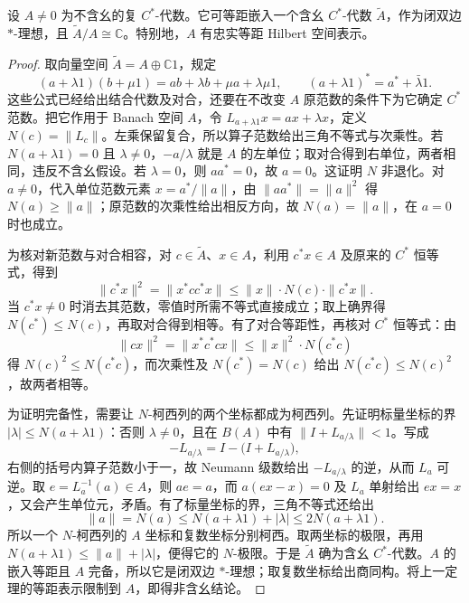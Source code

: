 \begin{proposition}[添幺与非含幺表示]\label{b2:prop:cstar-unitization-representation}
	设 \(A\ne0\) 为不含幺的复 \(C^*\)-代数。它可等距嵌入一个含幺 \(C^*\)-代数 \(\widetilde A\)，作为闭双边 \(*\)-理想，且 \(\widetilde A/A\cong\mathbb C\)。特别地，\(A\) 有忠实等距 Hilbert 空间表示。
\end{proposition}
\begin{proof}
	取向量空间 \(\widetilde A=A\oplus\mathbb C1\)，规定
	\[
		(a+\lambda1)(b+\mu1)=ab+\lambda b+\mu a+\lambda\mu1, \qquad (a+\lambda1)^*=a^*+\bar\lambda1.
	\]
	这些公式已经给出结合代数及对合，还要在不改变 \(A\) 原范数的条件下为它确定 \(C^*\) 范数。把它作用于 Banach 空间 \(A\)，令 \(L_{a+\lambda1}x=ax+\lambda x\)，定义 \(N(c)=\|L_c\|\)。左乘保留复合，所以算子范数给出三角不等式与次乘性。若 \(N(a+\lambda1)=0\) 且 \(\lambda\ne0\)，\(-a/\lambda\) 就是 \(A\) 的左单位；取对合得到右单位，两者相同，违反不含幺假设。若 \(\lambda=0\)，则 \(aa^*=0\)，故 \(a=0\)。这证明 \(N\) 非退化。对 \(a\ne0\)，代入单位范数元素 \(x=a^*/\|a\|\)，由 \(\|aa^*\|=\|a\|^2\) 得 \(N(a)\ge\|a\|\)；原范数的次乘性给出相反方向，故 \(N(a)=\|a\|\)，在 \(a=0\) 时也成立。

	为核对新范数与对合相容，对 \(c\in\widetilde A\)、\(x\in A\)，利用 \(c^*x\in A\) 及原来的 \(C^*\) 恒等式，得到
	\[
		\|c^*x\|^2=\|x^*cc^*x\| \le\|x\|\cdot N(c)\cdot\|c^*x\|.
	\]
	当 \(c^*x\ne0\) 时消去其范数，零值时所需不等式直接成立；取上确界得 \(N(c^*)\le N(c)\)，再取对合得到相等。有了对合等距性，再核对 \(C^*\) 恒等式：由
	\[
		\|cx\|^2=\|x^*c^*cx\|\le\|x\|^2\cdot N(c^*c)
	\]
	得 \(N(c)^2\le N(c^*c)\)，而次乘性及 \(N(c^*)=N(c)\) 给出 \(N(c^*c)\le N(c)^2\)，故两者相等。

	为证明完备性，需要让 \(N\)-柯西列的两个坐标都成为柯西列。先证明标量坐标的界 \(|\lambda|\le N(a+\lambda1)\)：否则 \(\lambda\ne0\)，且在 \(B(A)\) 中有 \(\|I+L_{a/\lambda}\|<1\)。写成
	\[
		-L_{a/\lambda}=I-\bigl(I+L_{a/\lambda}\bigr),
	\]
	右侧的括号内算子范数小于一，故 Neumann 级数给出 \(-L_{a/\lambda}\) 的逆，从而 \(L_a\) 可逆。取 \(e=L_a^{-1}(a)\in A\)，则 \(ae=a\)，而 \(a(ex-x)=0\) 及 \(L_a\) 单射给出 \(ex=x\)，又会产生单位元，矛盾。有了标量坐标的界，三角不等式还给出
	\[
		\|a\|=N(a)\le N(a+\lambda1)+|\lambda| \le2N(a+\lambda1).
	\]
	所以一个 \(N\)-柯西列的 \(A\) 坐标和复数坐标分别柯西。取两坐标的极限，再用 \(N(a+\lambda1)\le\|a\|+|\lambda|\)，便得它的 \(N\)-极限。于是 \(\widetilde A\) 确为含幺 \(C^*\)-代数。\(A\) 的嵌入等距且 \(A\) 完备，所以它是闭双边 \(*\)-理想；取复数坐标给出商同构。将上一定理的等距表示限制到 \(A\)，即得非含幺结论。
\end{proof}

